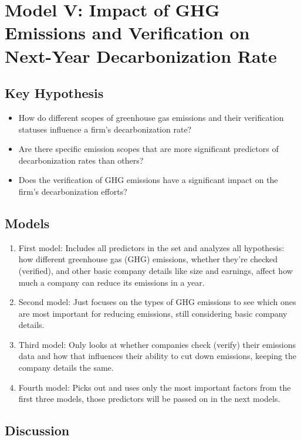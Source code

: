 \section{Model V: Impact of GHG Emissions and Verification on Next-Year Decarbonization Rate}

\subsection{Key Hypothesis}
\begin{itemize}
    \item How do different scopes of greenhouse gas emissions and their verification statuses influence a firm's decarbonization rate?
    \item Are there specific emission scopes that are more significant predictors of decarbonization rates than others?
    \item Does the verification of GHG emissions have a significant impact on the firm's decarbonization efforts?
\end{itemize}

\subsection{Models}
\begin{enumerate}
    \item First model: Includes all predictors in the set and analyzes all hypothesis: how different greenhouse gas (GHG) emissions, whether they're checked (verified), and other basic company details like size and earnings, affect how much a company can reduce its emissions in a year.
    \item Second model: Just focuses on the types of GHG emissions to see which ones are most important for reducing emissions, still considering basic company details.
    \item Third model: Only looks at whether companies check (verify) their emissions data and how that influences their ability to cut down emissions, keeping the company details the same.
    \item Fourth model: Picks out and uses only the most important factors from the first three models, those predictors will be passed on in the next models.
\end{enumerate}



\subsection{Discussion}

